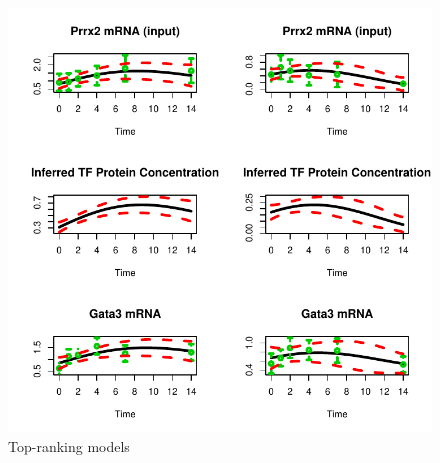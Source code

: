 \documentclass{article}
\begin{document}

\begin{figure}[htb]
  \centering
  \includegraphics[width=\columnwidth]{gpdisim_Prrx2_Gata3}
  \caption{Top-ranking models}
  \label{fig:model1}
\end{figure}
\end{document}
